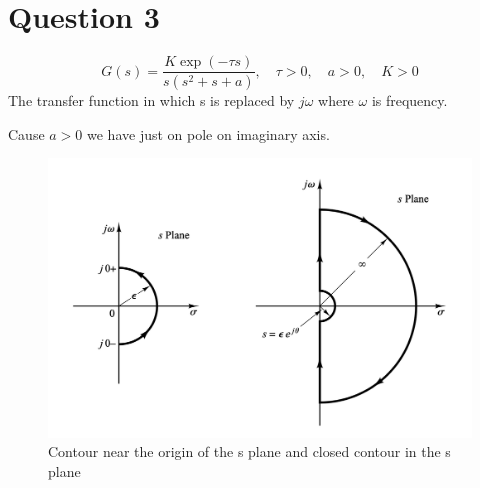\section{Question 3}
\begin{equation}
	G(s) = \dfrac{K\exp(-\tau s)}{s(s^2 + s + a)}, \quad \tau>0, \quad a > 0, \quad K > 0
\end{equation}
The transfer function in which s is replaced by $j\omega$ where $\omega$ is frequency.

Cause $a>0$ we have just on pole on imaginary axis.
\begin{figure}[H]
	\caption{Contour near the origin of the s plane and closed contour in the s plane}
	\centering
	\includegraphics[width=12cm]{../Figure/Q2/nyquist_s_plane.png}
\end{figure}
